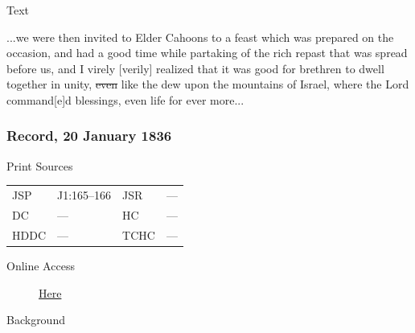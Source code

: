 				\begin{description}
					\item[Text]
				\end{description}
				
					...we were then invited to Elder Cahoons to a feast which was prepared on the occasion, and had a good time while partaking of the rich repast that was spread before us, and I virely [verily] realized that it was good for brethren to dwell together in unity, \sout{even} like the dew upon the mountains of Israel, where the Lord command[e]d blessings, even life for ever more...
					
		\subsubsection{Record, 20 January 1836}
			\label{EMS-1836-JS-20-JAN-1836}
			
			\begin{description}
					\item[Print Sources]
				\end{description}

					\begin{tabular}{p{0.5in}p{1in}p{0.5in}p{1in}}
					JSP	 	& J1:165--166		& JSR 		& --- \\
					DC	 	& ---				& HC 		& --- \\
					HDDC 	& ---				& TCHC 		& --- \\
					\end{tabular}
				
				\begin{description}
					\item[Online Access] \href{https://www.josephsmithpapers.org/paper-summary/journal-1835-1836/133}{Here}
				\end{description}
				
				\begin{description}
					\item[Background]
				\end{description}
				
				
